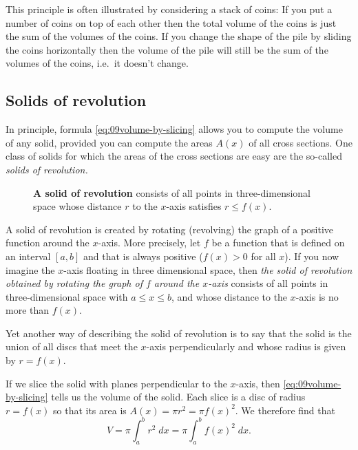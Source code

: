 This principle is often illustrated by considering a stack of coins: If you put
a number of coins on top of each other then the total volume of the coins is
just the sum of the volumes of the coins.  If you change the shape of the pile
by sliding the coins horizontally then the volume of the pile will still be the
sum of the volumes of the coins, i.e.\ it doesn't change.
\subsection{Solids of revolution}
In principle, formula \eqref{eq:09volume-by-slicing} allows you to compute the
volume of any solid, provided you can compute the areas $A(x)$ of all cross
sections.  One class of solids for which the areas of the cross sections are
easy are the so-called \emph{solids of revolution.}

\begin{figure}[h]\centering
  \parbox{175pt}{ }
  \parbox{175pt}{ }
  \parbox{175pt}{ }
  \caption{\textbf{A solid of revolution} consists of all points in
    three-dimensional space whose distance $r$ to the $x$-axis satisfies $r\leq
    f(x)$.}
  \label{fig:09surf_of_rotation}
\end{figure}

A solid of revolution is created by rotating (revolving) the graph of a positive
function around the $x$-axis.  More precisely, let $f$ be a function that is
defined on an interval $[a, b]$ and that is always positive ($f(x)>0$ for all
$x$).  If you now imagine the $x$-axis floating in three dimensional space, then
\emph{the solid of revolution obtained by rotating the graph of $f$ around the
  $x$-axis} consists of all points in three-dimensional space with $a\leq x\leq
b$, and whose distance to the $x$-axis is no more than $f(x)$.

Yet another way of describing the solid of revolution is to say that the solid
is the union of all discs that meet the $x$-axis perpendicularly and whose
radius is given by $r=f(x)$.

If we slice the solid with planes perpendicular to the $x$-axis, then
\eqref{eq:09volume-by-slicing} tells us the volume of the solid.  Each slice is
a disc of radius $r=f(x)$ so that its area is $A(x) = \pi r^2 = \pi f(x)^2$. We
therefore find that
\begin{equation}
  \label{eq:09volume_surf_of_revolution}
  V = \pi \int_a^b r^2 \; dx = \pi \int_a^b f(x)^2 \; dx.
\end{equation}

